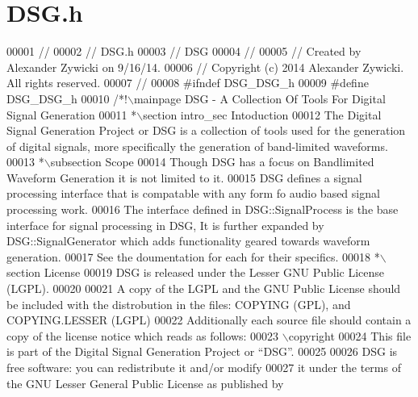 \hypertarget{_d_s_g_8h_source}{\section{D\+S\+G.\+h}
\label{_d_s_g_8h_source}
}

\begin{DoxyCode}
00001 \textcolor{comment}{//}
00002 \textcolor{comment}{//  DSG.h}
00003 \textcolor{comment}{//  DSG}
00004 \textcolor{comment}{//}
00005 \textcolor{comment}{//  Created by Alexander Zywicki on 9/16/14.}
00006 \textcolor{comment}{//  Copyright (c) 2014 Alexander Zywicki. All rights reserved.}
00007 \textcolor{comment}{//}
00008 \textcolor{preprocessor}{#ifndef DSG\_DSG\_h}
00009 \textcolor{preprocessor}{#define DSG\_DSG\_h}
00010 \textcolor{comment}{/*!\(\backslash\)mainpage DSG - A Collection Of Tools For Digital Signal Generation}
00011 \textcolor{comment}{ *\(\backslash\)section intro\_sec Intoduction}
00012 \textcolor{comment}{ The Digital Signal Generation Project or DSG is a collection of tools used for the generation of digital
       signals, more specifically the generation of band-limited waveforms.}
00013 \textcolor{comment}{ *\(\backslash\)subsection Scope}
00014 \textcolor{comment}{ Though DSG has a focus on Bandlimited Waveform Generation it is not limited to it. }
00015 \textcolor{comment}{ DSG defines a signal processing interface that is compatable with any form fo audio based signal
       processing work.}
00016 \textcolor{comment}{ The interface defined in DSG::SignalProcess is the base interface for signal processing in DSG, It is
       further expanded by DSG::SignalGenerator which adds functionality geared towards waveform generation.}
00017 \textcolor{comment}{ See the doumentation for each for their specifics.}
00018 \textcolor{comment}{ *\(\backslash\)section License}
00019 \textcolor{comment}{    DSG is released under the Lesser GNU Public License (LGPL).}
00020 \textcolor{comment}{  }
00021 \textcolor{comment}{ A copy of the LGPL and the GNU Public License should be included with the distrobution in the files:
       COPYING (GPL), and COPYING.LESSER (LGPL)}
00022 \textcolor{comment}{Additionally each source file should contain a copy of the license notice which reads as follows:}
00023 \textcolor{comment}{ \(\backslash\)copyright}
00024 \textcolor{comment}{ This file is part of the Digital Signal Generation Project or “DSG”.}
00025 \textcolor{comment}{}
00026 \textcolor{comment}{ DSG is free software: you can redistribute it and/or modify}
00027 \textcolor{comment}{ it under the terms of the GNU Lesser General Public License as published by}

\end{DoxyCode}
